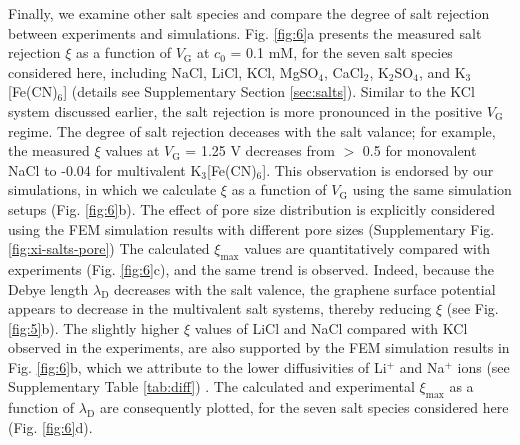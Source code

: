 \documentclass[journal=langd5,email=true, hyperref=true, keywords=false]{achemso}
\begin{document}
Finally, we examine other salt species and compare the degree of salt
rejection between experiments and simulations. Fig. \ref{fig:6}a
presents the measured salt rejection $\xi$ as a function of
$V_{\mathrm{G}}$ at $c_{0}$ = 0.1 mM, for the seven salt species
considered here, including NaCl, LiCl, KCl, MgSO$_{4}$, CaCl$_{2}$,
K$_{2}$SO$_{4}$, and K$_{3}$[Fe(CN)$_{6}$] (details see Supplementary
Section \ref{sec:salts}). Similar to the KCl system discussed
earlier, the salt rejection is more pronounced in the positive
$V_{\mathrm{G}}$ regime. 
The degree of salt rejection deceases with
the salt valance; for example, the measured $\xi$ values at
$V_{\mathrm{G}}$ = 1.25 V decreases from $>$ 0.5 for monovalent NaCl
to -0.04 for multivalent K$_{3}$[Fe(CN)$_{6}$]. This observation is
endorsed by our simulations, in which we calculate $\xi$ as a function
of $V_{\mathrm{G}}$ using the same simulation setups (Fig.
\ref{fig:6}b). 
{
The effect of pore size distribution is explicitly
considered using the FEM simulation results with different pore sizes
(Supplementary Fig. \ref{fig:xi-salts-pore})} 
The calculated $\xi_{\mathrm{max}}$ values are
quantitatively compared with experiments (Fig. \ref{fig:6}c), and
the same trend is observed. Indeed, because the Debye length
$\lambda_{\mathrm{D}}$ decreases with the salt valence, the graphene
surface potential appears to decrease in the multivalent salt systems,
thereby reducing $\xi$ (see Fig. \ref{fig:5}b).
{
The slightly higher $\xi$ values of LiCl and NaCl compared with KCl observed in the experiments, 
are also supported by the FEM simulation results in Fig. \ref{fig:6}b, 
which we attribute to the lower diffusivities of Li$^{+}$ and Na$^{+}$ ions (see Supplementary Table \ref{tab:diff})
}.
The calculated and
experimental $\xi_{\mathrm{max}}$ as a function of
$\lambda_{\mathrm{D}}$ are consequently plotted, for the seven salt
species considered here (Fig. \ref{fig:6}d). 
\end{document}
